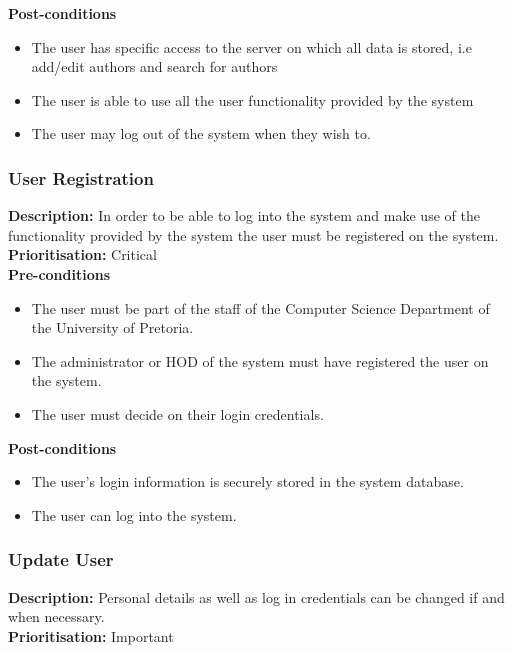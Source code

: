 \documentclass[a4paper]{article}
\begin{document}
    \textbf{Post-conditions}
     \begin{itemize}
        \item The user has specific access to the server on which all data is stored, i.e add/edit authors and search for authors
        \item The user is able to use all the user functionality provided by the system 
        \item The user may log out of the system when they wish to.
    \end{itemize}
    
    \subsubsection{User Registration}
    
    \textbf{Description:}  In order to be able to log into the system and make use of the functionality provided by the system the user must be registered on the system. \\
    \textbf{Prioritisation:} Critical\\
   
    \textbf{Pre-conditions}
     \begin{itemize}
        \item The user must be part of the staff of the Computer Science Department of the University of Pretoria.
        \item The administrator or HOD of the system must have registered the user on the system.
        \item The user must decide on their login credentials.
   \end{itemize}
    
    \textbf{Post-conditions}
    \begin{itemize}
        \item The user's login information is securely stored in the system database.
        \item The user can log into the system.
    \end{itemize}
    \pagebreak
    \subsubsection{Update User}
   
    \textbf{Description:} Personal details as well as log in credentials can be changed if and when necessary.\\
     \textbf{Prioritisation:} Important\\
     
\end{document}
